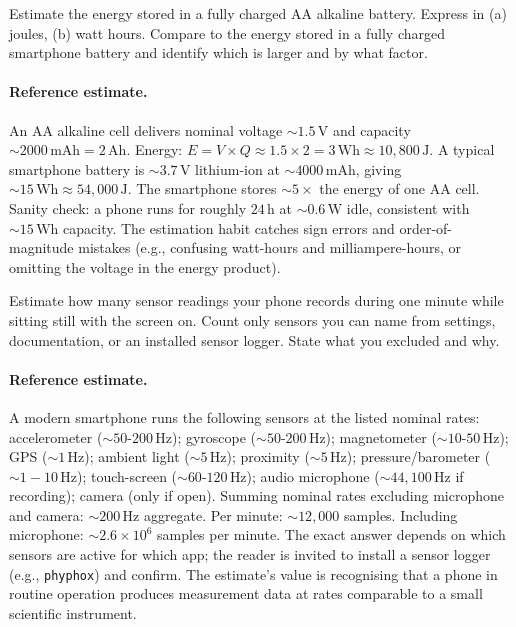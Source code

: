 \begin{exercise}
Estimate the energy stored in a fully charged AA alkaline battery.
Express in (a) joules, (b) watt hours. Compare to the energy stored
in a fully charged smartphone battery and identify which is larger
and by what factor.

\paragraph{Reference estimate.} An AA alkaline cell delivers nominal
voltage $\sim 1.5 \,\si{\volt}$ and capacity $\sim 2000 \,\si{\milli
\ampere\hour} = 2 \,\si{\ampere\hour}$. Energy: $E = V \times Q
\approx 1.5 \times 2 = 3 \,\si{\watt\hour} \approx 10{,}800 \,\si{
\joule}$. A typical smartphone battery is $\sim 3.7 \,\si{\volt}$
lithium-ion at $\sim 4000 \,\si{\milli\ampere\hour}$, giving
$\sim 15 \,\si{\watt\hour} \approx 54{,}000 \,\si{\joule}$. The
smartphone stores $\sim 5\times$ the energy of one AA cell. Sanity
check: a phone runs for roughly $24 \,\si{\hour}$ at $\sim 0.6 \,\si{
\watt}$ idle, consistent with $\sim 15 \,\si{\watt\hour}$ capacity.
The estimation habit catches sign errors and order-of-magnitude
mistakes (e.g., confusing watt-hours and milliampere-hours, or
omitting the voltage in the energy product).
\end{exercise}

\begin{exercise}
Estimate how many sensor readings your phone records during one
minute while sitting still with the screen on. Count only sensors you
can name from settings, documentation, or an installed sensor logger.
State what you excluded and why.

\paragraph{Reference estimate.} A modern smartphone runs the
following sensors at the listed nominal rates: accelerometer
($\sim 50$-$200 \,\si{\hertz}$); gyroscope ($\sim 50$-$200 \,\si{
\hertz}$); magnetometer ($\sim 10$-$50 \,\si{\hertz}$); GPS
($\sim 1 \,\si{\hertz}$); ambient light ($\sim 5 \,\si{\hertz}$);
proximity ($\sim 5 \,\si{\hertz}$); pressure/barometer ($\sim 1-10
\,\si{\hertz}$); touch-screen ($\sim 60$-$120 \,\si{\hertz}$); audio
microphone ($\sim 44{,}100 \,\si{\hertz}$ if recording); camera (only
if open). Summing nominal rates excluding microphone and camera:
$\sim 200 \,\si{\hertz}$ aggregate. Per minute: $\sim 12{,}000$
samples. Including microphone: $\sim 2.6 \times 10^6$ samples per
minute. The exact answer depends on which sensors are active for
which app; the reader is invited to install a sensor logger (e.g.,
\texttt{phyphox}) and confirm. The estimate's value is recognising
that a phone in routine operation produces measurement data at
rates comparable to a small scientific instrument.
\end{exercise}


